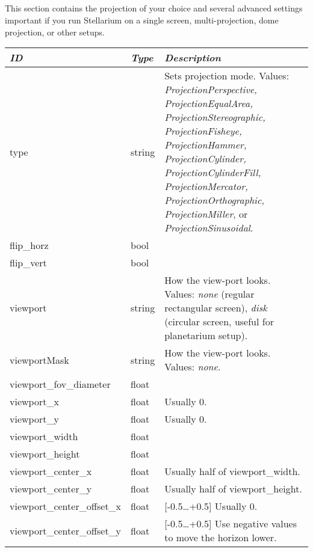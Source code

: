 \subsection{}

This section contains the projection of your choice and several
advanced settings important if you run Stellarium on a single screen,
multi-projection, dome projection, or other setups.

\begin{longtable}{l|l|p{80mm}}\toprule
\emph{ID} & \emph{Type} & \emph{Description}\\\midrule
type                       & string & Sets projection mode. Values: \emph{ProjectionPerspective,
                                      ProjectionEqualArea, ProjectionStereographic, ProjectionFisheye,
                                      ProjectionHammer, ProjectionCylinder, ProjectionCylinderFill, ProjectionMercator,
                                      ProjectionOrthographic, ProjectionMiller}, or \emph{ProjectionSinusoidal}.\\%
flip\_horz                   & bool & \\%
flip\_vert                   & bool & \\%
viewport                   & string & How the view-port looks. Values: \emph{none} (regular rectangular screen), 
                                      \emph{disk} (circular screen, useful for planetarium setup).\\%
viewportMask               & string & How the view-port looks. Values: \emph{none}.\\%
viewport\_fov\_diameter     & float & \\%
viewport\_x                 & float & Usually 0. \\%
viewport\_y                 & float & Usually 0. \\%
viewport\_width             & float & \\%
viewport\_height            & float & \\%
viewport\_center\_x         & float & Usually half of viewport\_width. \\%
viewport\_center\_y         & float & Usually half of viewport\_height. \\%
viewport\_center\_offset\_x & float & [-0.5\ldots+0.5] Usually 0. \\%
viewport\_center\_offset\_y & float & [-0.5\ldots+0.5] Use negative values to move the horizon lower. \\
\bottomrule
\end{longtable}

